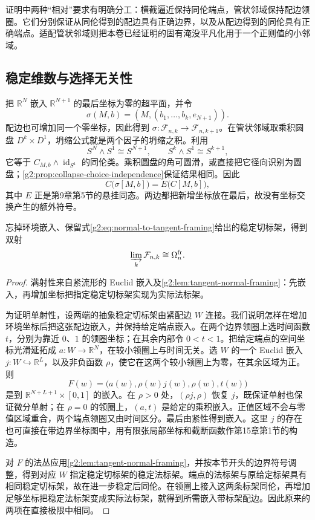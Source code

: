 证明中两种“相对”要求有明确分工：横截逼近保持同伦端点，管状邻域保持配边领圈。它们分别保证从同伦得到的配边具有正确边界，以及从配边得到的同伦具有正确端点。适配管状邻域则把本卷已经证明的固有淹没平凡化用于一个正则值的小邻域。

\subsection{稳定维数与选择无关性}
\label{g2:subsec:2302:05}
把 \(\mathbb R^N\) 嵌入 \(\mathbb R^{N+1}\) 的最后坐标为零的超平面，并令
\[
	\sigma(M,b)=(M,(b_1,\ldots,b_k,e_{N+1})).
\]
配边也可增加同一个零坐标，因此得到 \(\sigma:\mathcal F_{n,k}\to\mathcal F_{n,k+1}\)。在管状邻域取乘积圆盘 \(D^k\times D^1\)，坍缩公式就是两个因子的坍缩之积。利用
\[
	S^N\wedge S^1\cong S^{N+1},\qquad S^k\wedge S^1\cong S^{k+1},
\]
它等于 \(C_{M,b}\wedge\operatorname{id}_{S^1}\) 的同伦类。乘积圆盘的角可圆滑，或直接把它径向识别为圆盘；\cref{g2:prop:collapse-choice-independence}保证结果相同。因此
\begin{equation}\label{g2:eq:pt-suspension-compatibility}
	C\bigl(\sigma[M,b]\bigr)=E\bigl(C[M,b]\bigr),
\end{equation}
其中 \(E\) 正是第9章第5节的悬挂同态。两边都把新增坐标放在最后，故没有坐标交换产生的额外符号。

\begin{proposition}\label{g2:prop:stable-embedded-abstract-bordism}
	忘掉环境嵌入、保留式\eqref{g2:eq:normal-to-tangent-framing}给出的稳定切标架，得到双射
	\[
		\varinjlim_k\mathcal F_{n,k}\cong\Omega_n^{\mathrm{fr}}.
	\]
\end{proposition}
\begin{proof}
	满射性来自紧流形的 Euclid 嵌入及\cref{g2:lem:tangent-normal-framing}：先嵌入，再增加坐标把指定稳定切标架实现为实际法标架。

	为证明单射性，设两端的抽象稳定切标架由紧配边 \(W\) 连接。我们说明怎样在增加环境坐标后把这张配边嵌入，并保持给定端点嵌入。在两个边界领圈上选时间函数 \(t\)，分别为靠近 \(0\)、\(1\) 的领圈坐标；在其余内部令 \(0<t<1\)。把给定端点的空间坐标光滑延拓成 \(a:W\to\mathbb R^N\)，在较小领圈上与时间无关。选 \(W\) 的一个 Euclid 嵌入 \(j:W\hookrightarrow\mathbb R^L\)，以及非负函数 \(\rho\)，使它在这两个较小领圈上为零，在其余区域为正。则
	\[
		F(w)=\bigl(a(w),\rho(w)j(w),\rho(w),t(w)\bigr)
	\]
	是到 \(\mathbb R^{N+L+1}\times[0,1]\) 的嵌入。在 \(\rho>0\) 处，\((\rho j,\rho)\) 恢复 \(j\)，既保证单射也保证微分单射；在 \(\rho=0\) 的领圈上，\((a,t)\) 是给定的乘积嵌入。正值区域不会与零值区域重合，两个端点领圈又由时间区分。最后由紧性得到嵌入。这里 \(j\) 的存在也可直接在带边界坐标图中，用有限张局部坐标和截断函数作第15章第1节的构造。

	对 \(F\) 的法丛应用\cref{g2:lem:tangent-normal-framing}，并按本节开头的边界符号调整，得到对应 \(W\) 指定稳定切标架的稳定法标架。端点的法标架与原给定标架具有相同稳定切标架，故在进一步稳定后同伦。在领圈上接入这两条标架同伦，再增加足够坐标把稳定法标架变成实际法标架，就得到所需嵌入带标架配边。因此原来的两项在直接极限中相同。
\end{proof}

